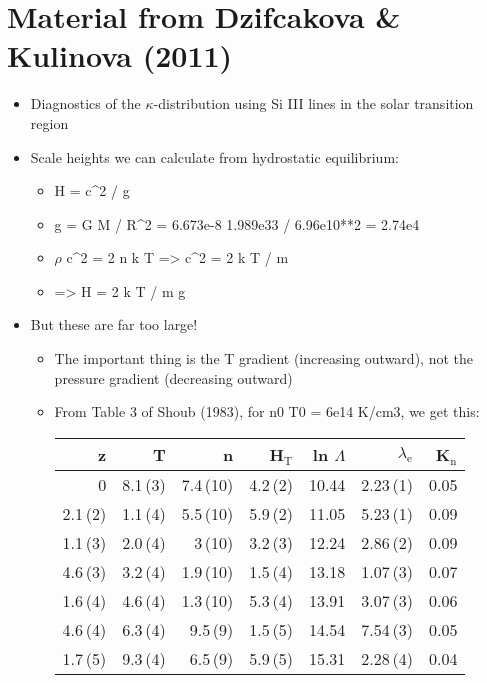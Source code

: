 \documentclass[11pt]{article}
\begin{document}
\section{Material from Dzifcakova \& Kulinova (2011)}
\label{sec:orgheadline12}
\begin{itemize}
\item Diagnostics of the \(\kappa\)-distribution using Si III lines in the solar transition region
\item Scale heights we can calculate from hydrostatic equilibrium:
\begin{itemize}
\item H = c\^{}2 / g
\item g = G M / R\^{}2 = 6.673e-8 1.989e33 / 6.96e10**2 = 2.74e4
\item \(\rho\) c\^{}2 = 2 n k T => c\^{}2 = 2 k T / m
\item => H = 2 k T / m g
\end{itemize}
\item But these are far too large!
\begin{itemize}
\item The important thing is the T gradient (increasing outward), not the pressure gradient (decreasing outward)
\item From Table 3 of Shoub (1983), for n0 T0 = 6e14 K/cm3, we get this:
\begin{center}
\begin{tabular}{rrrrrrr}
z & T & n & H\(_{\text{T}}\) & ln \(\Lambda\) & \(\lambda_{\text{e}}\) & K\(_{\text{n}}\)\\
\hline
0 & 8.1\,(3) & 7.4\,(10) & 4.2\,(2) & 10.44 & 2.23\,(1) & 0.05\\
2.1\,(2) & 1.1\,(4) & 5.5\,(10) & 5.9\,(2) & 11.05 & 5.23\,(1) & 0.09\\
1.1\,(3) & 2.0\,(4) & 3\,(10) & 3.2\,(3) & 12.24 & 2.86\,(2) & 0.09\\
4.6\,(3) & 3.2\,(4) & 1.9\,(10) & 1.5\,(4) & 13.18 & 1.07\,(3) & 0.07\\
1.6\,(4) & 4.6\,(4) & 1.3\,(10) & 5.3\,(4) & 13.91 & 3.07\,(3) & 0.06\\
4.6\,(4) & 6.3\,(4) & 9.5\,(9) & 1.5\,(5) & 14.54 & 7.54\,(3) & 0.05\\
1.7\,(5) & 9.3\,(4) & 6.5\,(9) & 5.9\,(5) & 15.31 & 2.28\,(4) & 0.04\\
\end{tabular}
\end{center}
\end{itemize}
\end{itemize}
\end{document}
